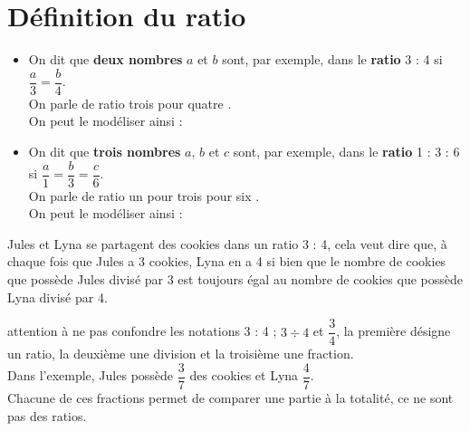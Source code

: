 \section{Définition du ratio}

\begin{definition}
   \begin{itemize}
      \item On dit que {\bf deux nombres} $a$ et $b$ sont, par exemple, dans le {\bf ratio} 3 : 4 si $\dfrac{a}{3} =\dfrac{b}{4}$. \\
         On parle de ratio \og trois pour quatre \fg. \\ [2mm]
         On peut le modéliser ainsi : \parbox{7cm}{}
      \item On dit que {\bf trois nombres} $a$, $b$ et $c$ sont, par exemple, dans le {\bf ratio} 1 : 3 : 6 si $\dfrac{a}{1} =\dfrac{b}{3} = \dfrac{c}{6}$. \\
      On parle de ratio \og un pour trois pour six \fg. \\ [2mm]
      On peut le modéliser ainsi : \parbox{7cm}{}
      \vspace{-4mm}
   \end{itemize}
\end{definition}

\begin{exemple*1}
   Jules et Lyna se partagent des cookies dans un ratio 3 : 4, cela veut dire que, à chaque fois que Jules a 3 cookies, Lyna en a 4 si bien que le nombre de cookies que possède Jules divisé par 3 est toujours égal au nombre de cookies que possède Lyna divisé par 4.
\end{exemple*1}

\begin{remarque}
   attention à ne pas confondre les notations 3 : 4 ; $3\div4$ et $\dfrac34$, la première désigne un ratio, la deuxième une division et la troisième une fraction. \\
   Dans l'exemple, Jules possède $\dfrac37$ des cookies et Lyna $\dfrac47$. \\ [1mm]
   Chacune de ces fractions permet de comparer une partie à la totalité, ce ne sont pas des ratios.
\end{remarque}
